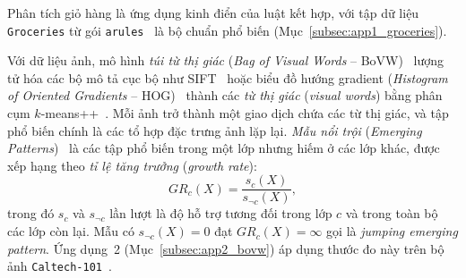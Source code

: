 Phân tích giỏ hàng là ứng dụng kinh điển của luật kết hợp, với tập dữ liệu \texttt{Groceries} từ gói \texttt{arules}~\cite{hahsler2005arules} là bộ chuẩn phổ biến (Mục~\ref{subsec:app1_groceries}).

Với dữ liệu ảnh, mô hình \emph{túi từ thị giác} (\emph{Bag of Visual Words} -- BoVW)~\cite{sivic2003video,csurka2004visual} lượng tử hóa các bộ mô tả cục bộ như SIFT~\cite{lowe2004distinctive} hoặc biểu đồ hướng gradient (\emph{Histogram of Oriented Gradients} -- HOG)~\cite{dalal2005histograms} thành các \emph{từ thị giác} (\emph{visual words}) bằng phân cụm $k$-means++~\cite{arthur2007kmeans}. Mỗi ảnh trở thành một giao dịch chứa các từ thị giác, và tập phổ biến chính là các tổ hợp đặc trưng ảnh lặp lại. \emph{Mẫu nổi trội} (\emph{Emerging Patterns})~\cite{dong1999efficient} là các tập phổ biến trong một lớp nhưng hiếm ở các lớp khác, được xếp hạng theo \emph{tỉ lệ tăng trưởng} (\emph{growth rate}):
\begin{equation}
GR_c(X) = \frac{s_c(X)}{s_{\neg c}(X)},
\label{eq:growth_rate}
\end{equation}
trong đó $s_c$ và $s_{\neg c}$ lần lượt là độ hỗ trợ tương đối trong lớp $c$ và trong toàn bộ các lớp còn lại. Mẫu có $s_{\neg c}(X) = 0$ đạt $GR_c(X) = \infty$ gọi là \emph{jumping emerging pattern}. Ứng dụng~2 (Mục~\ref{subsec:app2_bovw}) áp dụng thước đo này trên bộ ảnh \texttt{Caltech-101}~\cite{feifei2004learning}.
